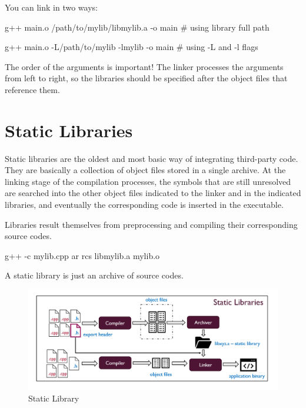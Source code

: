You can link in two ways:
\begin{codeblock}[language=bash]
    g++ main.o /path/to/mylib/libmylib.a -o main  # using library full path
\end{codeblock}
\begin{codeblock}[language=bash]
    g++ main.o -L/path/to/mylib -lmylib -o main  # using -L and -l flags
\end{codeblock}

\begin{warningblock}
    The order of the arguments is important! The linker processes the arguments from left to right, so
    the libraries should be specified after the object files that reference them.
\end{warningblock}


\section{Static Libraries}
Static libraries are the oldest and most basic way of integrating third-party code. They are basically
a collection of object files stored in a single archive.
At the linking stage of the compilation processes, the symbols that are still unresolved are
searched into the other object files indicated to the linker and in the indicated libraries, and
eventually the corresponding code is inserted in the executable.

Libraries result themselves from preprocessing and compiling their corresponding source codes. 

\begin{codeblock}[language=bash]
    g++ -c mylib.cpp
    ar rcs libmylib.a mylib.o
\end{codeblock}

\begin{definitionblock}
A static library is just an archive of source codes.
\end{definitionblock}

\begin{figure}[H]
    \centering
    \includegraphics[width=\textwidth]{assets/static_lib.png}
    \caption{Static Library}
\end{figure}

